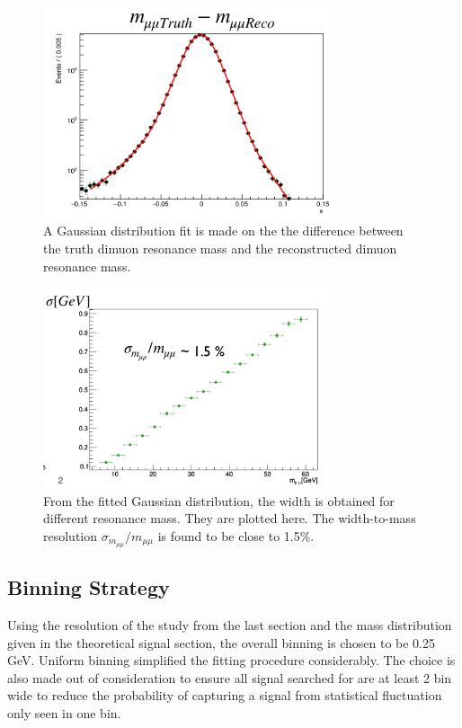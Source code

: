 \begin{figure}[!htb]
    \begin{center}
        \includegraphics[width=0.75\textwidth]{figures/chapter_dimuon/fitError}        
        \caption{
            A Gaussian distribution fit is made on the the difference between the truth dimuon resonance mass and the reconstructed dimuon resonance mass.    }
    \end{center}
\end{figure}
   
\begin{figure}[!htb]
    \begin{center}
        \includegraphics[width=0.75\textwidth]{figures/chapter_dimuon/sigma}        
        \caption{
        From the fitted Gaussian distribution, the width is obtained for different resonance mass. They are plotted here. The width-to-mass resolution $\sigma_{m_{\mu\mu}}/m_{\mu\mu}$ is found to be close to 1.5\%.}
    \end{center}
\end{figure}


\subsection{Binning Strategy}
Using the resolution of the study from the last section and the mass distribution given in the theoretical signal section, the overall binning is chosen to be 0.25 GeV. Uniform binning simplified the fitting procedure considerably. The choice is also made out of consideration to ensure all signal searched for are at least 2 bin wide to reduce the probability of capturing a signal from statistical fluctuation only seen in one bin.

